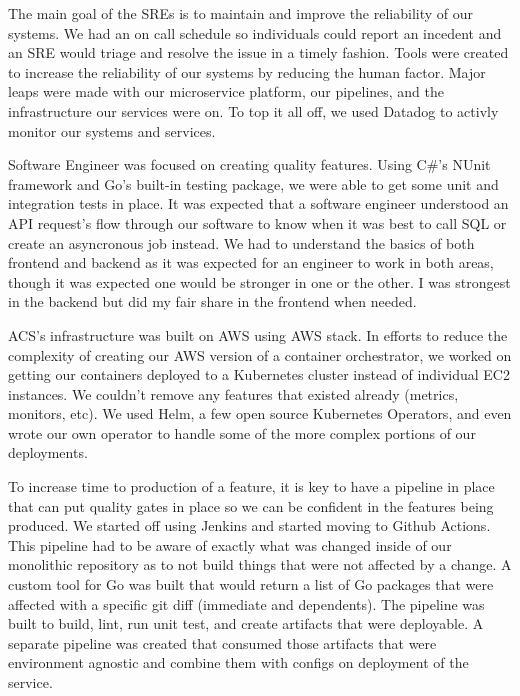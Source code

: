 \documentclass[10pt,a4paper,ragged2e,withhyper]{altacv}
\begin{document}
\begin{paracol}{2}

The main goal of the SREs is to maintain and improve the reliability of our systems. We had an on call
schedule so individuals could report an incedent and an SRE would triage and resolve the issue in a
timely fashion. Tools were created to increase the reliability of our systems by reducing the human
factor. Major leaps were made with our microservice platform, our pipelines, and the infrastructure
our services were on. To top it all off, we used Datadog to activly monitor our systems and services.

Software Engineer was focused on creating quality features. Using C\#'s NUnit framework and Go's built-in
testing package, we were able to get some unit and integration tests in place. It was expected that a software
engineer understood an API request's flow through our software to know when it was best to call SQL or
create an asyncronous job instead. We had to understand the basics of both frontend and backend as it was
expected for an engineer to work in both areas, though it was expected one would be stronger in one or the other.
I was strongest in the backend but did my fair share in the frontend when needed.


ACS's infrastructure was built on AWS using AWS stack. In efforts to reduce the complexity of creating our AWS
version of a container orchestrator, we worked on getting our containers deployed to a Kubernetes cluster instead
of individual EC2 instances. We couldn't remove any features that existed already (metrics, monitors, etc). We used Helm,
a few open source Kubernetes Operators, and even wrote our own operator to handle some of the more complex portions
of our deployments.

To increase time to production of a feature, it is key to have a pipeline in place that can put quality gates in place
so we can be confident in the features being produced. We started off using Jenkins and started moving to Github Actions.
This pipeline had to be aware of exactly what was changed inside of our monolithic repository as to not build things that
were not affected by a change. A custom tool for Go was built that would return a list of Go packages that were
affected with a specific git diff (immediate and dependents). The pipeline was built to build, lint, run unit test, and create
artifacts that were deployable. A separate pipeline was created that consumed those artifacts that were environment agnostic
and combine them with configs on deployment of the service.


\end{paracol}
\end{document}
